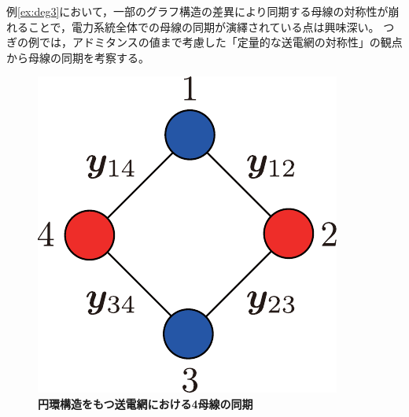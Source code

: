 \documentclass[tombow,dvipdfmx]{corona-a5-1.1}
\begin{document}
例\ref{ex:deg3}において，一部のグラフ構造の差異により同期する母線の対称性が崩れることで，電力系統全体での母線の同期が演繹されている点は興味深い。
つぎの例では，アドミタンスの値まで考慮した「定量的な送電網の対称性」の観点から母線の同期を考察する。

\begin{figure}[t]
\centering
\includegraphics[width = .20\linewidth]{figs/4busbox}
\medskip
\caption{\textbf{円環構造をもつ送電網における4母線の同期}}
\label{fig:4busbox}
\medskip
\end{figure}
\end{document}
